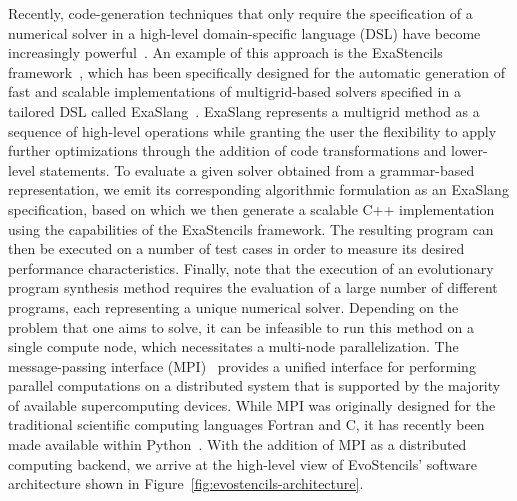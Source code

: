 Recently, code-generation techniques that only require the specification of a numerical solver in a high-level domain-specific language (DSL) have become increasingly powerful~\cite{kostler2020code}.
An example of this approach is the ExaStencils framework~\cite{lengauer2020exastencils,lengauer2014exastencils}, which has been specifically designed for the automatic generation of fast and scalable implementations of multigrid-based solvers specified in a tailored DSL called ExaSlang~\cite{schmitt2014exaslang,schmitt2016systems,kuckuk2016automatic}.
ExaSlang represents a multigrid method as a sequence of high-level operations while granting the user the flexibility to apply further optimizations through the addition of code transformations and lower-level statements.
To evaluate a given solver obtained from a grammar-based representation, we emit its corresponding algorithmic formulation as an ExaSlang specification, based on which we then generate a scalable C++ implementation using the capabilities of the ExaStencils framework.
The resulting program can then be executed on a number of test cases in order to measure its desired performance characteristics.
Finally, note that the execution of an evolutionary program synthesis method requires the evaluation of a large number of different programs, each representing a unique numerical solver.
Depending on the problem that one aims to solve, it can be infeasible to run this method on a single compute node, which necessitates a multi-node parallelization.
The message-passing interface (MPI)~\cite{walker1996mpi} provides a unified interface for performing parallel computations on a distributed system that is supported by the majority of available supercomputing devices.
While MPI was originally designed for the traditional scientific computing languages Fortran and C, it has recently been made available within Python~\cite{dalcin2021mpi4py}. 
With the addition of MPI as a distributed computing backend, we arrive at the high-level view of EvoStencils' software architecture shown in Figure~\ref{fig:evostencils-architecture}.
